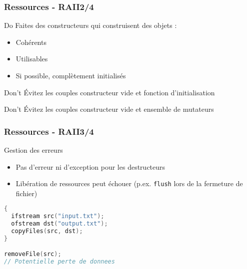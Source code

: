 \documentclass[C++.tex]{subfiles}
\begin{document}
\begin{frame}
	\frametitle{Ressources - RAII\titlehfill{}2/4}
	\begin{exampleblock}{Do}
		Faites des constructeurs qui construisent des objets :
		\begin{itemize}
			\item Cohérents
			\item Utilisables
			\item Si possible, complètement initialisés
		\end{itemize}
	\end{exampleblock}

	\begin{alertblock}{Don't}
		Évitez les couples constructeur \og vide\fg{} et fonction d'initialisation

	\end{alertblock}

	\begin{alertblock}{Don't}
		Évitez les couples constructeur \og vide\fg{} et ensemble de mutateurs

	\end{alertblock}
\end{frame}

\begin{frame}[fragile]
	\frametitle{Ressources - RAII\titlehfill{}3/4}
	\begin{alertblock}{Gestion des erreurs}
		\begin{itemize}
			\item Pas d'erreur ni d'exception pour les destructeurs
			\item Libération de ressources peut échouer (p.ex. \lstinline|flush| lors de la fermeture de fichier)

		\end{itemize}
	\end{alertblock}

	\begin{lstlisting}[language=C++]
{
  ifstream src("input.txt");
  ofstream dst("output.txt");
  copyFiles(src, dst);
}

removeFile(src);
// Potentielle perte de donnees\end{lstlisting}

\end{frame}
\end{document}
